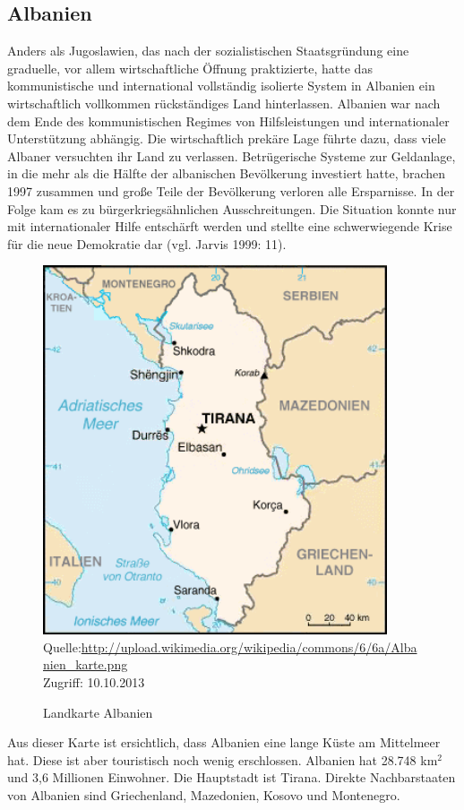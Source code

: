 \subsection{Albanien}
Anders als Jugoslawien, das nach der sozialistischen Staatsgründung eine graduelle, vor allem wirtschaftliche Öffnung praktizierte, hatte das kommunistische und international vollständig isolierte System in Albanien ein wirtschaftlich vollkommen rückständiges Land hinterlassen. Albanien war nach dem Ende des kommunistischen Regimes von Hilfsleistungen und internationaler Unterstützung abhängig. Die wirtschaftlich prekäre Lage führte dazu, dass viele Albaner versuchten ihr Land zu verlassen. Betrügerische Systeme zur Geldanlage, in die mehr als die Hälfte der albanischen Bevölkerung investiert hatte, brachen 1997 zusammen und große Teile der Bevölkerung verloren alle Ersparnisse. In der Folge kam es zu bürgerkriegsähnlichen Ausschreitungen. Die Situation konnte nur mit internationaler Hilfe entschärft werden und stellte eine schwerwiegende Krise für die neue Demokratie dar (vgl. Jarvis 1999: 11).
\begin{figure}[H]
  \caption{Landkarte Albanien}
  \centering
  \includegraphics[width=4in]{Material/Albanien_karte}\\
  \scriptsize{Quelle:\url{http://upload.wikimedia.org/wikipedia/commons/6/6a/Albanien_karte.png}\\ Zugriff: 10.10.2013}
\end{figure}

Aus dieser Karte ist ersichtlich, dass Albanien eine lange Küste am Mittelmeer hat. Diese ist aber touristisch noch wenig erschlossen. Albanien hat 28.748 km$^2$ und 3,6 Millionen Einwohner. Die Hauptstadt ist Tirana. Direkte Nachbarstaaten von Albanien sind Griechenland, Mazedonien, Kosovo und Montenegro.

